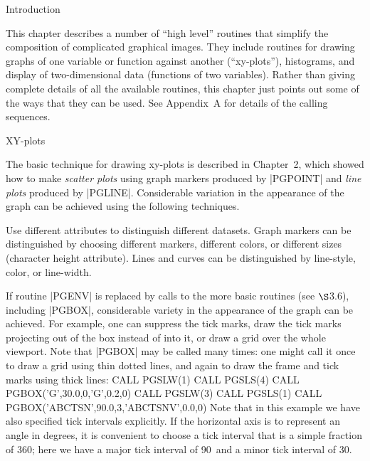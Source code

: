 

\beginsection Introduction

This chapter describes a number of ``high level'' routines that
simplify the composition of complicated graphical images.  They include 
routines for drawing graphs of one variable or function against another
(``xy-plots''), histograms, and display of two-dimensional data 
(functions of two variables).  Rather than giving complete details
of all the available routines, this chapter just points out some of the 
ways that they can be used. See Appendix~A for details of the calling 
sequences.

\beginsection XY-plots

The basic technique for drawing xy-plots is described in Chapter~2,
which showed how to make {\it scatter plots\/} using graph markers
produced by |PGPOINT| and {\it line plots\/} produced by |PGLINE|.
Considerable variation in the appearance of the graph can be achieved
using the following techniques.

Use different attributes to distinguish different datasets.  Graph markers
can be distinguished by choosing different markers, different colors, or
different sizes (character height attribute).  Lines and curves can be 
distinguished by line-style, color, or line-width.

If routine |PGENV| is replaced by calls to the more basic routines
(see $\S$3.6), including |PGBOX|, considerable variety in the appearance 
of the graph can be achieved.  For example, one can suppress the tick 
marks, draw the tick marks projecting out of the box instead of into it,
or draw a grid over the whole viewport.  Note that |PGBOX| may be
called many times: one might call it once to draw a grid using thin
dotted lines, and again to draw the frame and tick marks using thick 
lines:
\begintt
      CALL PGSLW(1)
      CALL PGSLS(4)
      CALL PGBOX('G',30.0,0,'G',0.2,0)
      CALL PGSLW(3)
      CALL PGSLS(1)
      CALL PGBOX('ABCTSN',90.0,3,'ABCTSNV',0.0,0)
\endtt
Note that in this example we have also specified tick intervals 
explicitly.  If the horizontal axis is to represent an angle in degrees, 
it is convenient to choose a tick interval that is a simple fraction of
360; here we have a major tick interval of 90\deg\ and a minor tick 
interval of 30\deg.

